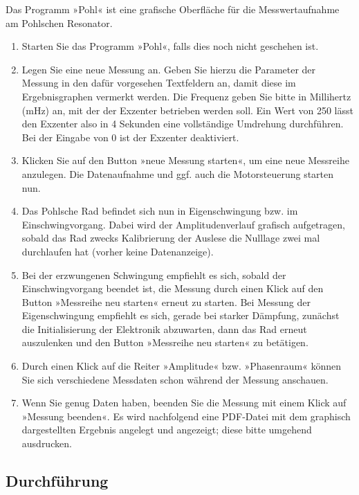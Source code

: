Das Programm »Pohl« ist eine grafische Oberfläche für die Messwertaufnahme am Pohlschen Resonator.
\begin{enumerate}
	\item Starten Sie das Programm »Pohl«, falls dies noch nicht geschehen ist.
	\item Legen Sie eine neue Messung an. Geben Sie hierzu die Parameter der Messung in den dafür vorgesehen Textfeldern an, damit diese im Ergebnisgraphen vermerkt werden. Die Frequenz geben Sie bitte in Millihertz (mHz) an, mit der der Exzenter betrieben werden soll. Ein Wert von 250 lässt den Exzenter also in 4 Sekunden eine vollständige Umdrehung durchführen. Bei der Eingabe von 0 ist der Exzenter deaktiviert.
	\item Klicken Sie auf den Button »neue Messung starten«, um eine neue Messreihe anzulegen. Die Datenaufnahme und ggf. auch die Motorsteuerung starten nun.
	\item Das Pohlsche Rad befindet sich nun in Eigenschwingung bzw. im Einschwingvorgang. Dabei wird der Amplitudenverlauf grafisch aufgetragen, sobald das Rad zwecks Kalibrierung der Auslese die Nulllage zwei mal durchlaufen hat (vorher keine Datenanzeige). 
	\item Bei der erzwungenen Schwingung empfiehlt es sich, sobald der Einschwingvorgang beendet ist, die Messung durch einen Klick auf den Button »Messreihe neu starten« erneut zu starten. Bei Messung der Eigenschwingung empfiehlt es sich, gerade bei starker Dämpfung, zunächst die Initialisierung der Elektronik abzuwarten, dann das Rad erneut auszulenken und den Button »Messreihe neu starten« zu betätigen.
	\item Durch einen Klick auf die Reiter »Amplitude« bzw. »Phasenraum« können Sie sich verschiedene Messdaten schon während der Messung anschauen.
	\item Wenn Sie genug Daten haben, beenden Sie die Messung mit einem Klick auf »Messung beenden«. Es wird nachfolgend eine PDF-Datei mit dem graphisch dargestellten Ergebnis angelegt und angezeigt; diese bitte umgehend ausdrucken.
\end{enumerate}

\subsection{Durchführung}

